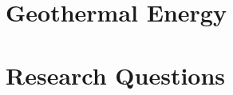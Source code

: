 \section{Geothermal Energy}\label{ch1:geothermal}

\section{Research Questions}\label{ch1:researchqs}
